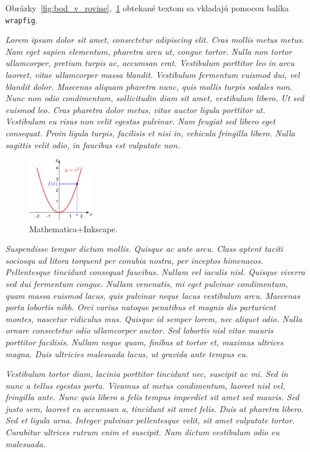 Obrázky~\ref{fig:bod_v_rovine},~\ref{fig:parabola} obtekané textom sa vkladajú pomocou balíka \verb|wrapfig|.

\textit{Lorem ipsum dolor sit amet, consectetur adipiscing elit. Cras mollis metus metus. Nam eget sapien elementum, pharetra arcu ut, congue tortor. Nulla non tortor ullamcorper, pretium turpis ac, accumsan erat. Vestibulum porttitor leo in arcu laoreet, vitae ullamcorper massa blandit. Vestibulum fermentum euismod dui, vel blandit dolor. Maecenas aliquam pharetra nunc, quis mollis turpis sodales non. Nunc non odio condimentum, sollicitudin diam sit amet, vestibulum libero. Ut sed euismod leo. Cras pharetra dolor metus, vitae auctor ligula porttitor ut. Vestibulum eu risus non velit egestas pulvinar. Nam feugiat sed libero eget consequat. Proin ligula turpis, facilisis et nisi in, vehicula fringilla libero. Nulla sagittis velit odio, in faucibus est vulputate non.}

\begin{figure}
	\centering
	\includegraphics[width=0.25\textwidth]{parabola}
	\caption{Mathematica+Inkscape.}
	\label{fig:parabola}
\end{figure}
\textit{Suspendisse tempor dictum mollis. Quisque ac ante arcu. Class aptent taciti sociosqu ad litora torquent per conubia nostra, per inceptos himenaeos. Pellentesque tincidunt consequat faucibus. Nullam vel iaculis nisl. Quisque viverra sed dui fermentum congue. Nullam venenatis, mi eget pulvinar condimentum, quam massa euismod lacus, quis pulvinar neque lacus vestibulum arcu. Maecenas porta lobortis nibh. Orci varius natoque penatibus et magnis dis parturient montes, nascetur ridiculus mus. Quisque id semper lorem, nec aliquet odio. Nulla ornare consectetur odio ullamcorper auctor. Sed lobortis nisl vitae mauris porttitor facilisis. Nullam neque quam, finibus at tortor et, maximus ultrices magna. Duis ultricies malesuada lacus, ut gravida ante tempus eu.}

\textit{Vestibulum tortor diam, lacinia porttitor tincidunt nec, suscipit ac mi. Sed in nunc a tellus egestas porta. Vivamus at metus condimentum, laoreet nisl vel, fringilla ante. Nunc quis libero a felis tempus imperdiet sit amet sed mauris. Sed justo sem, laoreet eu accumsan a, tincidunt sit amet felis. Duis at pharetra libero. Sed et ligula urna. Integer pulvinar pellentesque velit, sit amet vulputate tortor. Curabitur ultrices rutrum enim et suscipit. Nam dictum vestibulum odio eu malesuada.}


